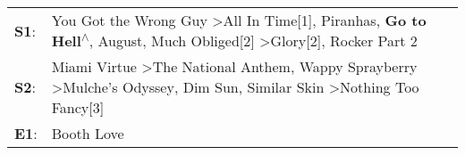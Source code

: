 \begin{supertabular}{p{0.03\textwidth}p{0.92\textwidth}}
 \textbf{S1}:  &  You Got the Wrong Guy\textsuperscript{} \textgreater \enspace All In Time[1]\textsuperscript{}, \enspace Piranhas\textsuperscript{}, \enspace \textbf{Go to Hell\textsuperscript{$\wedge$}}, \enspace August\textsuperscript{}, \enspace Much Obliged[2]\textsuperscript{} \textgreater \enspace Glory[2]\textsuperscript{}, \enspace Rocker Part 2\textsuperscript{}  \enspace  \\
 \textbf{S2}:  &                             Miami Virtue\textsuperscript{} \textgreater \enspace The National Anthem\textsuperscript{}, \enspace Wappy Sprayberry\textsuperscript{} \textgreater \enspace Mulche's Odyssey\textsuperscript{}, \enspace Dim Sun\textsuperscript{}, \enspace Similar Skin\textsuperscript{} \textgreater \enspace Nothing Too Fancy[3]\textsuperscript{}  \enspace  \\
 \textbf{E1}:  &                                                                                                                                                                                                                                                                                                                                           Booth Love\textsuperscript{}  \enspace  \\
\end{supertabular}
